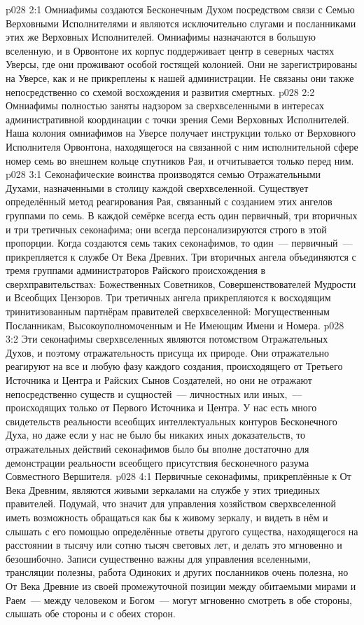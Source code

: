 \vs p028 2:1 Омниафимы создаются Бесконечным Духом посредством связи с Семью Верховными Исполнителями и являются исключительно слугами и посланниками этих же Верховных Исполнителей. Омниафимы назначаются в большую вселенную, и в Орвонтоне их корпус поддерживает центр в северных частях Уверсы, где они проживают особой гостящей колонией. Они не зарегистрированы на Уверсе, как и не прикреплены к нашей администрации. Не связаны они также непосредственно со схемой восхождения и развития смертных.
\vs p028 2:2 Омниафимы полностью заняты надзором за сверхвселенными в интересах административной координации с точки зрения Семи Верховных Исполнителей. Наша колония омниафимов на Уверсе получает инструкции только от Верховного Исполнителя Орвонтона, находящегося на связанной с ним исполнительной сфере номер семь во внешнем кольце спутников Рая, и отчитывается только перед ним.
\vs p028 3:1 Секонафические воинства производятся семью Отражательными Духами, назначенными в столицу каждой сверхвселенной. Существует определённый метод реагирования Рая, связанный с созданием этих ангелов группами по семь. В каждой семёрке всегда есть один первичный, три вторичных и три третичных секонафима; они всегда персонализируются строго в этой пропорции. Когда создаются семь таких секонафимов, то один~--- первичный~--- прикрепляется к службе От Века Древних. Три вторичных ангела объединяются с тремя группами администраторов Райского происхождения в сверхправительствах: Божественных Советников, Совершенствователей Мудрости и Всеобщих Цензоров. Три третичных ангела прикрепляются к восходящим тринитизованным партнёрам правителей сверхвселенной: Могущественным Посланникам, Высокоуполномоченным и Не Имеющим Имени и Номера.
\vs p028 3:2 Эти секонафимы сверхвселенных являются потомством Отражательных Духов, и поэтому отражательность присуща их природе. Они отражательно реагируют на все и любую фазу каждого создания, происходящего от Третьего Источника и Центра и Райских Сынов Создателей, но они не отражают непосредственно существ и сущностей~--- личностных или иных,~--- происходящих только от Первого Источника и Центра. У нас есть много свидетельств реальности всеобщих интеллектуальных контуров Бесконечного Духа, но даже если у нас не было бы никаких иных доказательств, то отражательных действий секонафимов было бы вполне достаточно для демонстрации реальности всеобщего присутствия бесконечного разума Совместного Вершителя.
\vs p028 4:1 Первичные секонафимы, прикреплённые к От Века Древним, являются живыми зеркалами на службе у этих триединых правителей. Подумай, что значит для управления хозяйством сверхвселенной иметь возможность обращаться как бы к живому зеркалу, и видеть в нём и слышать с его помощью определённые ответы другого существа, находящегося на расстоянии в тысячу или сотню тысяч световых лет, и делать это мгновенно и безошибочно. Записи существенно важны для управления вселенными, трансляции полезны, работа Одиноких и других посланников очень полезна, но От Века Древние из своей промежуточной позиции между обитаемыми мирами и Раем~--- между человеком и Богом~--- могут мгновенно смотреть в обе стороны, слышать обе стороны и  с обеих сторон.
